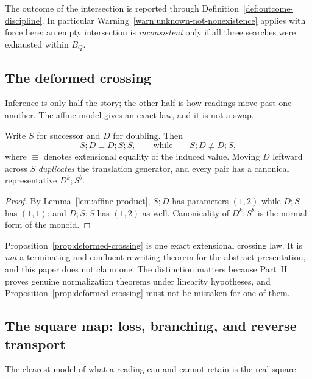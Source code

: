 The outcome of the intersection is reported through
Definition~\ref{def:outcome-discipline}.  In particular
Warning~\ref{warn:unknown-not-nonexistence} applies with force here: an empty
intersection is \emph{inconsistent} only if all three searches were exhausted within
$B_Q$.

\subsection{The deformed crossing}

Inference is only half the story; the other half is how readings move past one
another.  The affine model gives an exact law, and it is not a swap.

\begin{proposition}\label{prop:deformed-crossing}
Write $S$ for successor and $D$ for doubling.  Then
\[
  S;D\equiv D;S;S,\qquad\text{while}\qquad S;D\not\equiv D;S,
\]
where $\equiv$ denotes extensional equality of the induced value.  Moving $D$ leftward
across $S$ \emph{duplicates} the translation generator, and every pair has a canonical
representative $D^{k};S^{b}$.
\end{proposition}

\begin{proof}
By Lemma~\ref{lem:affine-product}, $S;D$ has parameters $(1,2)$ while $D;S$ has
$(1,1)$; and $D;S;S$ has $(1,2)$ as well.  Canonicality of $D^{k};S^{b}$ is the normal
form of the monoid.
\end{proof}

\begin{warning}\label{warn:not-confluent}
Proposition~\ref{prop:deformed-crossing} is one exact extensional crossing law.  It is
\emph{not} a terminating and confluent rewriting theorem for the abstract
presentation, and this paper does not claim one.  The distinction matters because
Part~II proves genuine normalization theorems under linearity hypotheses, and
Proposition~\ref{prop:deformed-crossing} must not be mistaken for one of them.
\end{warning}

\subsection{The square map: loss, branching, and reverse transport}

The clearest model of what a reading can and cannot retain is the real square.

